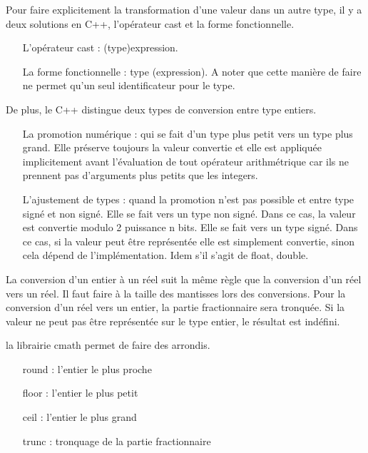 \documentclass{article}
\begin{document}
Pour faire explicitement la transformation d'une valeur dans un autre type, il y a deux solutions en C++, l'opérateur cast et la forme fonctionnelle. 

\bigskip
\begin{itemize}
    \item [L'opérateur cast :] (type)expression.
    \item [La forme fonctionnelle :] type (expression). A noter que cette manière de faire ne permet qu'un seul identificateur pour le type.
\end{itemize}
\bigskip

De plus, le C++ distingue deux types de conversion entre type entiers. 

\bigskip
\begin{itemize}
    \item [La promotion numérique :] qui se fait d'un type plus petit vers un type plus grand. Elle préserve toujours la valeur convertie et elle est appliquée implicitement avant l'évaluation de tout opérateur arithmétrique car ils ne prennent pas d'arguments plus petits que les integers. 
    \item [L'ajustement de types :] quand la promotion n'est pas possible et entre type signé et non signé. Elle se fait vers un type non signé. Dans ce cas, la valeur est convertie modulo 2 puissance n bits. Elle se fait vers un type signé. Dans ce cas, si la valeur peut être représentée elle est simplement convertie, sinon cela dépend de l'implémentation. Idem s'il s'agit de float, double. 
\end{itemize}
\bigskip

La conversion d'un entier à un réel suit la même règle que la conversion d'un réel vers un réel. Il faut faire à la taille des mantisses lors des conversions. Pour la conversion d'un réel vers un entier, la partie fractionnaire sera tronquée. Si la valeur ne peut pas être représentée sur le type entier, le résultat est indéfini. 

la librairie cmath permet de faire des arrondis.
\bigskip
\begin{itemize}
    \item [round :]  l'entier le plus proche
    \item [floor :] l'entier le plus petit 
    \item [ceil :] l'entier le plus grand 
    \item [trunc :] tronquage de la partie fractionnaire
\end{itemize}
\bigskip
\end{document}
